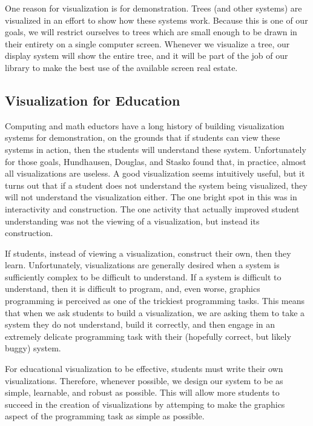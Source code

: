 \documentclass{article}
\begin{document}
One reason for visualization is for demonstration.  Trees (and other systems)
are visualized in an effort to show how these systems work.  Because this is
one of our goals, we will restrict ourselves to trees which are small enough to
be drawn in their entirety on a single computer screen.  Whenever we visualize a tree, our display system will show the entire tree, and it will be part of the job of our library to make the best use of the available screen real estate.

\subsection{Visualization for Education}
\label{educ}

Computing and math eductors have a long history of building visualization
systems for demonstration, on the grounds that if students can view these
systems in action, then the students will understand these system.
Unfortunately for those goals, Hundhausen, Douglas, and Stasko found that, in practice, almost all
visualizations are useless\cite{hds}.  A good visualization seems intuitively useful, but
it turns out that if a student does not understand the system being visualized, they will not understand the visualization either.  The one bright spot in this was in interactivity and construction.  The one activity that actually improved student understanding was not the viewing of a visualization, but instead its construction.

If students, instead of viewing a visualization, construct their own, then they
learn.  Unfortunately, visualizations are generally desired when a system is
sufficiently complex to be difficult to understand.  If a system is difficult
to understand, then it is difficult to program, and, even worse, graphics
programming is perceived as one of the trickiest programming tasks.  This means
that when we ask students to build a visualization, we are asking them to take
a system they do not understand, build it correctly, and then engage in an
extremely delicate programming task with their (hopefully correct, but likely
buggy) system.

For educational visualization to be effective, students must write their own
visualizations.  Therefore, whenever possible, we design our system to be as
simple, learnable, and robust as possible.  This will allow more students to
succeed in the creation of visualizations by attemping to make the graphics
aspect of the programming task as simple as possible.
\end{document}
